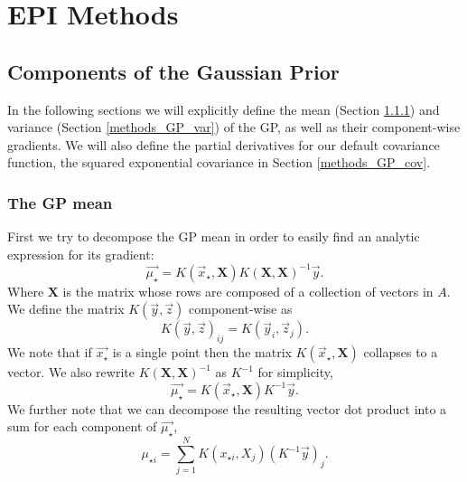 
\section{EPI Methods} %
\label{cha:EPI Methods}

\subsection{Components of the Gaussian Prior}
\label{comp_of_gp}

In the following sections we will explicitly define the mean (Section \ref{methods_GP_mean}) and variance (Section \ref{methods_GP_var}) of the GP, as well as their component-wise gradients. We will also define the partial derivatives for our default covariance function, the squared exponential covariance in Section \ref{methods_GP_cov}.

\subsubsection{The GP mean}
\label{methods_GP_mean}

First we try to decompose the GP mean in order to easily find an analytic expression for its gradient:
\begin{equation}
 \vec{\mu_{\star}} = K(\vec{x}_{\star}, \textbf{X} )K(\textbf{X},\textbf{X})^{-1}\vec{y}.
\end{equation}
Where $\textbf{X}$ is the matrix whose rows are composed of a collection of vectors in $A$. We define the matrix $K(\vec{y}, \vec{z})$ component-wise as
\begin{equation}
    K(\vec{y}, \vec{z})_{ij} = K(\vec{y}_{i}, \vec{z}_{j}).
\end{equation}
We note that if $\vec{x_{\star}}$ is a single point then the matrix $K(\vec{x}_{\star}, \textbf{X} )$ collapses to a vector. We also rewrite $K(\textbf{X},\textbf{X})^{-1}$ as $K^{-1}$ for simplicity,
\begin{equation}
 \vec{\mu_{\star}} = K(\vec{x}_{\star}, \textbf{X} ) K^{-1} \vec{y}.
\end{equation}
We further note that we can decompose the resulting vector dot product into a sum for each component of $\vec{\mu_{\star}}$,
\begin{equation}
 \mu_{\star {i}} = \sum_{j = 1}^{N} K(x_{\star i}, X_{j}) \left(K^{-1} \vec{y} \right)_{j}.
\end{equation}

